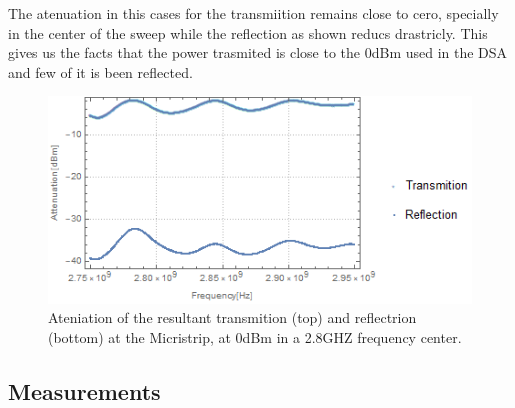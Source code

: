 The atenuation in this cases for the transmiition remains close to cero, specially in the center of the sweep while the reflection as shown reducs drastricly. This gives  us the facts that the power trasmited is close to the 0dBm used in the DSA and few of it is been reflected.

\begin{figure}
	\centering
	\includegraphics[width=0.7\linewidth]{../figures/microstrip-trasm-eflect}
	\caption[trans-refl]{Ateniation of the resultant transmition (top) and reflectrion (bottom) at the Micristrip, at 0dBm in a 2.8GHZ frequency center.}
	\label{fig:microstrip-trasm-eflect}
\end{figure}







\subsection{Measurements}